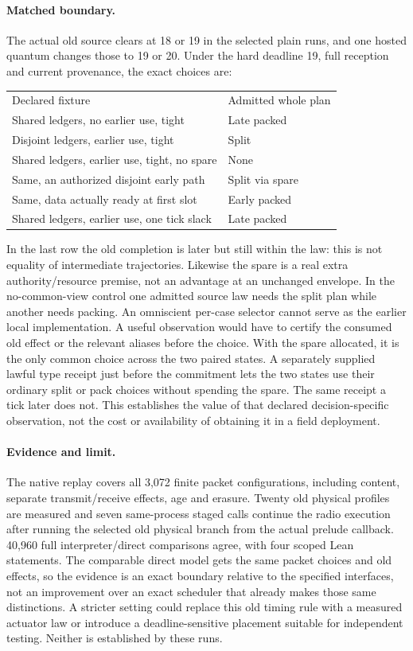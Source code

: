 \documentclass[11pt]{article}
\begin{document}
\paragraph{Matched boundary.}
The actual old source clears at 18 or 19 in the selected
plain runs, and one hosted quantum changes those to 19 or 20.
Under the hard deadline 19, full reception and current
provenance, the exact choices are:
\begin{center}
\begin{tabular}{ll}
Declared fixture & Admitted whole plan \\
Shared ledgers, no earlier use, tight & Late packed \\
Disjoint ledgers, earlier use, tight & Split \\
Shared ledgers, earlier use, tight, no spare & None \\
Same, an authorized disjoint early path & Split via spare \\
Same, data actually ready at first slot & Early packed \\
Shared ledgers, earlier use, one tick slack & Late packed \\
\end{tabular}
\end{center}
In the last row the old completion is later but still within
the law: this is not equality of intermediate trajectories.
Likewise the spare is a real extra authority/resource premise,
not an advantage at an unchanged envelope. In the no-common-view
control one admitted source law needs the split plan while another
needs packing. An omniscient per-case selector cannot serve as
the earlier local implementation. A useful observation would
have to certify the consumed old effect or the relevant
aliases before the choice. With the spare allocated,
it is the only common choice across the two paired states.
A separately supplied lawful type receipt just before the
commitment lets the two states use their ordinary split or
pack choices without spending the spare. The same receipt a
tick later does not. This establishes the value of that
declared decision-specific observation, not the cost or
availability of obtaining it in a field deployment.

\paragraph{Evidence and limit.}
The native replay covers all 3,072 finite packet configurations,
including content, separate transmit/receive effects, age and
erasure. Twenty old physical profiles are measured and seven
same-process staged calls continue the radio execution after
running the selected old physical branch from the actual
prelude callback. 40,960 full interpreter/direct comparisons
agree, with four scoped Lean statements. The comparable direct
model gets the same packet choices and old effects, so the
evidence is an exact boundary relative to the specified
interfaces, not an improvement over an exact scheduler that
already makes those same distinctions. A stricter setting
could replace this old timing rule with a measured actuator
law or introduce a deadline-sensitive placement suitable for
independent testing. Neither is established by these runs.
\end{document}
